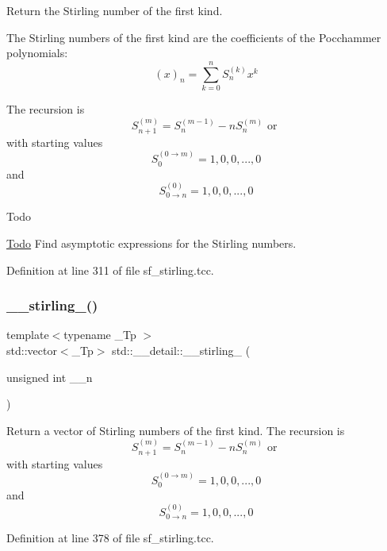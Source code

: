 Return the Stirling number of the first kind.

The Stirling numbers of the first kind are the coefficients of the Pocchammer polynomials\+: \[ (x)_n = \sum_{k=0}^{n} S_n^{(k)} x^k \]

The recursion is \[ S_{n+1}^{(m)} = S_n^{(m-1)} - n S_n^{(m)} \mbox{ or } \] with starting values \[ S_0^{(0\rightarrow m)} = {1, 0, 0, ..., 0} \] and \[ S_{0\rightarrow n}^{(0)} = {1, 0, 0, ..., 0} \]

\begin{DoxyRefDesc}{Todo}
\item[\hyperlink{todo__todo000015}{Todo}]Find asymptotic expressions for the Stirling numbers. \end{DoxyRefDesc}


Definition at line 311 of file sf\+\_\+stirling.\+tcc.

\mbox{\label{namespacestd_1_1____detail_a8d1c581fb8fddd354f7f1cbbdbe6f2d2}} 
\subsubsection{\texorpdfstring{\+\_\+\+\_\+stirling\+\_()}{\_\_stirling\_1()}\hspace{0.1cm}{\footnotesize\ttfamily [2/2]}}
{\footnotesize\ttfamily template$<$typename \+\_\+\+Tp $>$ \\
std\+::vector$<$\+\_\+\+Tp$>$ std\+::\+\_\+\+\_\+detail\+::\+\_\+\+\_\+stirling\+\_ (\begin{DoxyParamCaption}\item[{unsigned int}]{\+\_\+\+\_\+n }\end{DoxyParamCaption})}

Return a vector of Stirling numbers of the first kind. The recursion is \[ S_{n+1}^{(m)} = S_n^{(m-1)} - n S_n^{(m)} \mbox{ or } \] with starting values \[ S_0^{(0\rightarrow m)} = {1, 0, 0, ..., 0} \] and \[ S_{0\rightarrow n}^{(0)} = {1, 0, 0, ..., 0} \] 

Definition at line 378 of file sf\+\_\+stirling.\+tcc.

\mbox{\label{namespacestd_1_1____detail_a0a47b5d34956a55f438f2ba079680acd}} 
